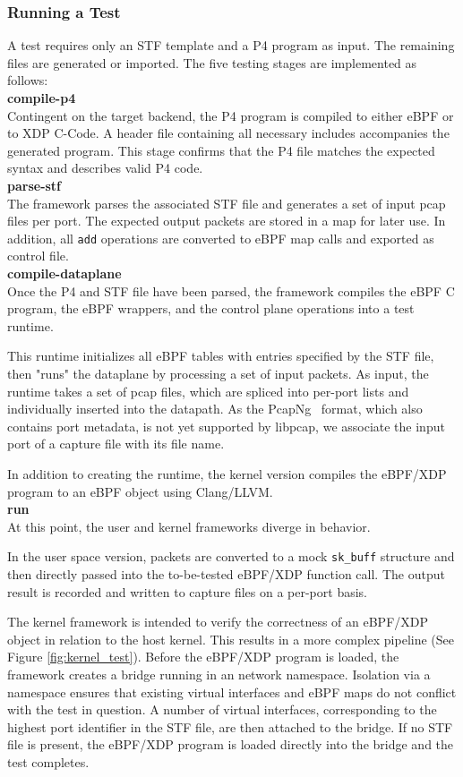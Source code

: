 \subsubsection{Running a Test}
A test requires only an STF template and a P4 program as input. The 
remaining files are generated or imported. The five testing stages are 
implemented as follows:\\

\noindent\textbf{compile-p4}\\
Contingent on the target backend, the P4 program is compiled to either eBPF or 
to XDP C-Code. A header file containing all necessary includes accompanies the 
generated program. This stage confirms that the P4 file matches the expected 
syntax and describes valid P4 code.\\ 
\textbf{parse-stf}\\
The framework parses the associated STF file and generates a set of input pcap 
files per port. The expected output packets are stored in a map for later use. 
In addition, all \texttt{add} operations are converted to eBPF map calls and 
exported as control file.\\
\textbf{compile-dataplane}\\
Once the P4 and STF file have been parsed, the framework compiles 
the eBPF C program, the eBPF wrappers, and the control plane operations into a 
test runtime.

This runtime initializes all eBPF tables with entries specified by the STF 
file, then "runs" the dataplane by processing a set of input packets.
As input, the runtime takes a set of pcap files, which are spliced into 
per-port lists and individually inserted into the datapath.
As the PcapNg~\cite{pcapng} format, which also contains port metadata, is 
not yet supported by libpcap, we associate the input port of a capture file with
its file name.

In addition to creating the runtime, the kernel version compiles the eBPF/XDP 
program to an eBPF object using Clang/LLVM.\\
\textbf{run}\\
At this point, the user and kernel frameworks diverge in behavior.

In the user space version, packets are converted to a mock \texttt{sk\_buff} 
structure and then directly passed into the to-be-tested eBPF/XDP function 
call. The output result is recorded and written to capture files on a per-port 
basis.

The kernel framework is intended to verify the correctness of an 
eBPF/XDP object in relation to the host kernel. This results in a more complex 
pipeline (See Figure \ref{fig:kernel_test}). 
Before the eBPF/XDP program is loaded, the framework creates a bridge running 
in an 
network namespace. Isolation via a namespace ensures that existing 
virtual interfaces and eBPF maps do not conflict with the test in question.
A number of virtual interfaces, corresponding to 
the highest port identifier in the STF file, are then attached to the 
bridge. If no STF file is present, the eBPF/XDP program is loaded directly into 
the bridge and the test completes.

